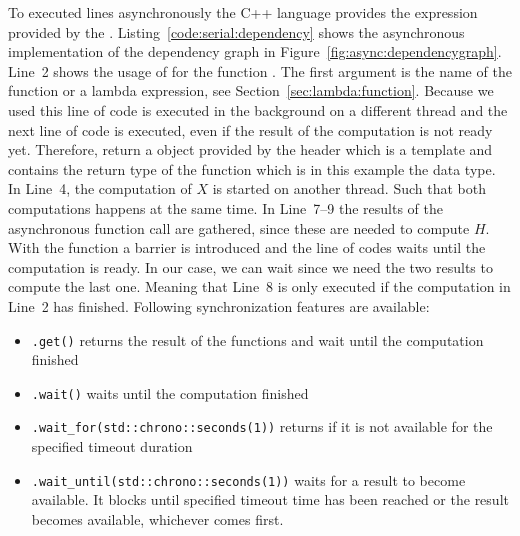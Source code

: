 \documentclass[11pt,fleqn]{book} %
\begin{document}
To executed lines asynchronously the C++ language provides the  expression provided by the . Listing~\ref{code:serial:dependency} shows the asynchronous implementation of the dependency graph in Figure~\ref{fig:async:dependencygraph}. Line~2 shows the usage of  for the function . The first argument is the name of the function or a lambda expression, see Section~\ref{sec:lambda:function}. Because we used  this line of code is executed in the background on a different thread and the next line of code is executed, even if the result of the computation is not ready yet. Therefore,  return a  object provided by the  header which is a template and contains the return type of the function which is in this example the  data type. In Line~4, the computation of $X$ is started on another thread. Such that both computations happens at the same time. In Line~7--9 the results of the asynchronous function call are gathered, since these are needed to compute $H$. With the  function a barrier is introduced and the line of codes waits until the computation is ready. In our case, we can wait since we need the two results to compute the last one. Meaning that Line~8 is only executed if the computation in Line~2 has finished. Following synchronization features are available:
\begin{itemize}
\item \lstinline|.get()| returns the result of the functions and wait until the computation finished
\item \lstinline|.wait()| waits until the computation finished
\item \lstinline|.wait_for(std::chrono::seconds(1))| returns if it is not available for the specified timeout duration 
\item \lstinline|.wait_until(std::chrono::seconds(1))| waits for a result to become available. It blocks until specified timeout time has been reached or the result becomes available, whichever comes first. 
\end{itemize}
\end{document}
